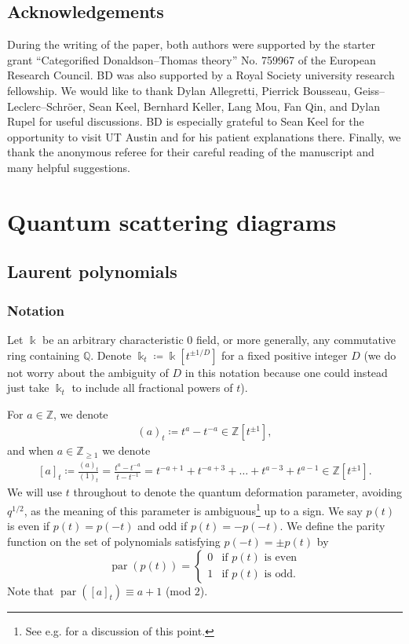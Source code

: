 \documentclass{amsart}
\DeclareMathOperator{\parit}{par}
\let\bb=\mathbb
\newcommand {\kk} {\Bbbk}
\newcommand {\kt} {\kk_t}
\theoremstyle{plain}%
\theoremstyle{definition}
\theoremstyle{remark}
\begin{document}
\subsection{Acknowledgements} During the writing of the paper, both authors were supported by the starter grant ``Categorified Donaldson--Thomas theory'' No. 759967 of the European Research Council. BD was also supported by a Royal Society university research fellowship.  We would like to thank Dylan Allegretti, Pierrick Bousseau, Geiss--Leclerc--Schr{\"o}er, Sean Keel, Bernhard Keller, Lang Mou, Fan Qin, and Dylan Rupel for useful discussions.  BD is especially grateful to Sean Keel for the opportunity to visit UT Austin and for his patient explanations there.  Finally, we thank the anonymous referee for their careful reading of the manuscript and many helpful suggestions.

\section{Quantum scattering diagrams}
\label{QSD_sec}

\subsection{Laurent polynomials}\label{Section-Notation}

\subsubsection{Notation}
Let $\kk$ be an arbitrary characteristic $0$ field, or more generally, any commutative ring containing $\bb{Q}$.  Denote $\kt\coloneqq \kk[t^{\pm 1/D}]$ for a fixed positive integer $D$ (we do not worry about the ambiguity of $D$ in this notation because one could instead just take $\kt$ to include all fractional powers of $t$). 

For $a\in \bb{Z}$, we denote
\begin{align}\label{at}
    (a)_t\coloneqq t^a-t^{-a} \in \bb{Z}[t^{\pm 1}],
\end{align}
and when $a\in \bb{Z}_{\geq 1}$ we denote
\begin{align}\label{at2}
    [a]_t\coloneqq \frac{(a)_t}{(1)_t}=\frac{t^a-t^{-a}}{t-t^{-1}}=t^{-a+1}+t^{-a+3}+\ldots+t^{a-3}+t^{a-1}\in \bb{Z}[t^{\pm 1}].
\end{align}
We will use $t$ throughout to denote the quantum deformation parameter, avoiding $q^{1/2}$, as the meaning of this parameter is ambiguous\footnote{See e.g. \cite[Rem 4.25]{DMSS} for a discussion of this point.} up to a sign. 
We say $p(t)$ is even if $p(t)=p(-t)$ and odd if $p(t)=-p(-t)$.  We define the parity function on the set of polynomials satisfying $p(-t)=\pm p(t)$ by
  \[
  \parit(p(t))=\begin{cases}0& \textrm{if }p(t) \textrm{ is even}\\
  1& \textrm{if }p(t) \textrm{ is odd.}\end{cases}
  \]
Note that $\parit([a]_t)\equiv a+1$ (mod $2$).
\end{document}
